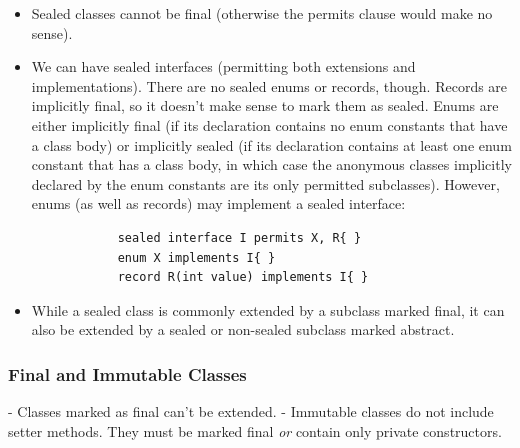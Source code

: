\documentclass{scrartcl}
\begin{document}
    \begin{itemize}
        \item Sealed classes cannot be final (otherwise the permits clause would make no sense).
        \item   We can have sealed interfaces (permitting both extensions and implementations). There are no sealed enums or records, though.
        Records are implicitly final, so it doesn't make sense to mark them as sealed.
        Enums are either implicitly final (if its declaration contains no enum constants that have a class body) or implicitly sealed (if its declaration contains at least one enum constant that has a class body, in which case the anonymous classes implicitly declared by the enum constants are its only permitted subclasses).
        However, enums (as well as records) may implement a sealed interface:

        \begin{lstlisting}
            sealed interface I permits X, R{ }
            enum X implements I{ }
            record R(int value) implements I{ }
        \end{lstlisting}
        \item While a sealed class is commonly extended by a subclass marked final, it can also be extended by a sealed or non-­sealed subclass marked abstract.
    \end{itemize}

\subsubsection{Final and Immutable Classes}

    - Classes marked as final can’t be extended.
    - Immutable classes do not include setter methods. They must be marked final \textit{or} contain only private constructors.
\end{document}

